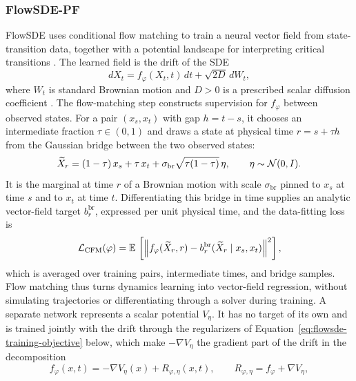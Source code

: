 \subsubsection{FlowSDE-PF}\label{sec:related-flowsde}
FlowSDE uses conditional flow matching to train a neural vector field from state-transition data, together with a potential landscape for interpreting critical transitions \citep{lou2026flowsde}. The learned field is the drift of the SDE
\begin{equation}\label{eq:flowsde-related-dynamics}
 dX_t=f_\varphi(X_t,t)\,dt+\sqrt{2D}\,dW_t,
\end{equation}
where $W_t$ is standard Brownian motion and $D>0$ is a prescribed scalar diffusion coefficient \citep[Section~1.1]{lou2026flowsde_supp}. The flow-matching step constructs supervision for $f_\varphi$ between observed states. For a pair $(x_s,x_t)$ with gap $h=t-s$, it chooses an intermediate fraction $\tau\in(0,1)$ and draws a state at physical time $r=s+\tau h$ from the Gaussian bridge between the two observed states:
\begin{equation}\label{eq:flowsde-bridge}
 \widetilde X_r=(1-\tau)\,x_s+\tau\,x_t+\sigma_{\mathrm{br}}\sqrt{\tau(1-\tau)}\,\eta,
 \qquad \eta\sim\mathcal N(0,I).
\end{equation}
It is the marginal at time $r$ of a Brownian motion with scale $\sigma_{\mathrm{br}}$ pinned to $x_s$ at time $s$ and to $x_t$ at time $t$. Differentiating this bridge in time supplies an analytic vector-field target $b_r^{\mathrm{br}}$, expressed per unit physical time, and the data-fitting loss is
\begin{equation}\label{eq:flowsde-cfm-regression}
 \mathcal L_{\mathrm{CFM}}(\varphi)
 =\mathbb E\,\left[
 \left\|f_\varphi(\widetilde X_r,r)
       -b_r^{\mathrm{br}}(\widetilde X_r\mid x_s,x_t)\right\|^2\right],
\end{equation}
which is averaged over training pairs, intermediate times, and bridge samples. Flow matching thus turns dynamics learning into vector-field regression, without simulating trajectories or differentiating through a solver during training. A separate network represents a scalar potential $V_\eta$. It has no target of its own and is trained jointly with the drift through the regularizers of Equation~\eqref{eq:flowsde-training-objective} below, which make $-\nabla V_\eta$ the gradient part of the drift in the decomposition
\begin{equation}\label{eq:flowsde-potential-decomposition}
 f_\varphi(x,t)=-\nabla V_\eta(x)+R_{\varphi,\eta}(x,t),
 \qquad R_{\varphi,\eta}=f_\varphi+\nabla V_\eta,
\end{equation}
